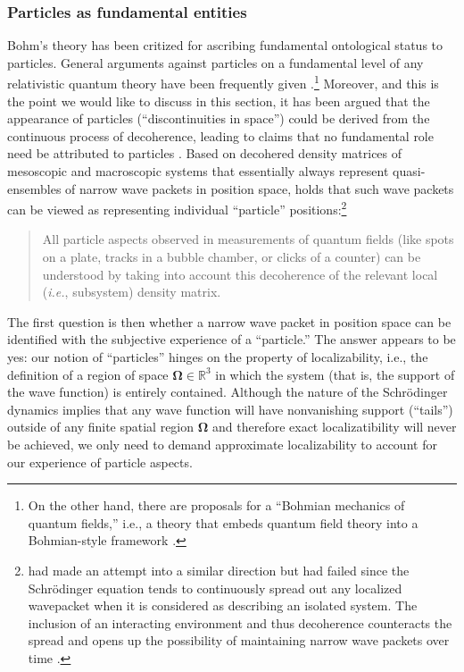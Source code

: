 \documentclass[twocolumn,rmp,aps,amsmath,amsfonts,noshowkeys,noshowpacs]{revtex4}
\begin{document}
\subsubsection{Particles as fundamental entities} 

Bohm's theory has been critized for ascribing fundamental ontological
status to particles. General arguments against particles on a
fundamental level of any relativistic quantum theory have been
frequently given \citetext{see, for instance,
  \citealp{Malament:1996:gt}, and
  \citealp{Halvorson:2002:xz}}.\footnote{On the other hand, there are
  proposals for a ``Bohmian mechanics of quantum fields,'' i.e., a
  theory that embeds quantum field theory into a Bohmian-style
  framework \citep{Durr:2003:gu,Durr:2002:gs}.}  Moreover, and this is
the point we would like to discuss in this section, it has been argued
that the appearance of particles (``discontinuities in space'') could
be derived from the continuous process of decoherence, leading to
claims that no fundamental role need be attributed to particles
\citep{Zeh:1993:lt,Zeh:1999:rr,Zeh:2003:pp}.  Based on decohered
density matrices of mesoscopic and macroscopic systems that
essentially always represent quasi-ensembles of narrow wave packets in
position space, \citet[p.~190]{Zeh:1993:lt} holds that such wave
packets can be viewed as representing individual ``particle''
positions:\footnote{\citet{Schrodinger:1926:pz} had made an attempt
  into a similar direction but had failed since the Schr\"odinger
  equation tends to continuously spread out any localized wavepacket
  when it is considered as describing an isolated system. The
  inclusion of an interacting environment and thus decoherence
  counteracts the spread and opens up the possibility of maintaining
  narrow wave packets over time \citep{Joos:1985:iu}.}
%
\begin{quote} {\small 
    All particle aspects observed in measurements of quantum fields
    (like spots on a plate, tracks in a bubble chamber, or clicks of a
    counter) can be understood by taking into account this decoherence
    of the relevant local (\emph{i.e.}, subsystem) density matrix.}
\end{quote}
%
The first question is then whether a narrow wave packet in position
space can be identified with the subjective experience of a
``particle.'' The answer appears to be yes: our notion of
``particles'' hinges on the property of localizability, i.e., the
definition of a region of space $\mathbf{\Omega} \in \mathbb{R}^3$ in
which the system (that is, the support of the wave function) is
entirely contained. Although the nature of the Schr\"odinger dynamics
implies that any wave function will have nonvanishing support
(``tails'') outside of any finite spatial region $\mathbf{\Omega}$ and
therefore exact localizatibility will never be achieved, we only need
to demand approximate localizability to account for our experience of
particle aspects.
\end{document}
